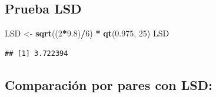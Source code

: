 \documentclass[
]{article}
\newenvironment{Shaded}{\begin{snugshade}}{\end{snugshade}}
\newcommand{\DecValTok}[1]{\textcolor[rgb]{0.00,0.00,0.81}{#1}}
\newcommand{\FloatTok}[1]{\textcolor[rgb]{0.00,0.00,0.81}{#1}}
\newcommand{\FunctionTok}[1]{\textcolor[rgb]{0.13,0.29,0.53}{\textbf{#1}}}
\newcommand{\NormalTok}[1]{#1}
\newcommand{\OtherTok}[1]{\textcolor[rgb]{0.56,0.35,0.01}{#1}}
\newcommand{\SpecialCharTok}[1]{\textcolor[rgb]{0.81,0.36,0.00}{\textbf{#1}}}
\begin{document}
\subsection{Prueba LSD}\label{prueba-lsd}

\begin{Shaded}
\begin{Highlighting}[]
\NormalTok{LSD }\OtherTok{\textless{}{-}} \FunctionTok{sqrt}\NormalTok{((}\DecValTok{2}\SpecialCharTok{*}\FloatTok{9.8}\NormalTok{)}\SpecialCharTok{/}\DecValTok{6}\NormalTok{) }\SpecialCharTok{*} \FunctionTok{qt}\NormalTok{(}\FloatTok{0.975}\NormalTok{, }\DecValTok{25}\NormalTok{)}
\NormalTok{LSD}
\end{Highlighting}
\end{Shaded}

\begin{verbatim}
## [1] 3.722394
\end{verbatim}

\subsection{Comparación por pares con
LSD:}\label{comparaciuxf3n-por-pares-con-lsd}
\end{document}
